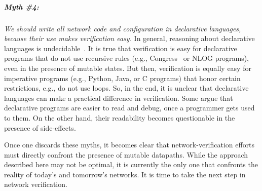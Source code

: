 \subparagraph*{Myth \#4:} \emph{We should write all network code and configuration in declarative languages, because their use makes verification easy.} In general, reasoning about declarative languages is undecidable~\cite{Halevy}. It is true that verification is easy for declarative programs that do not use recursive rules (e.g., Congress~\cite{congress} or NLOG programs), even in the presence of mutable states. But then, verification is equally easy for imperative programs (e.g., Python, Java, or C programs) that honor certain restrictions, e.g., do not use loops. So, in the end, it is unclear that declarative languages can make a practical difference in verification. Some argue that declarative programs are easier to read and debug, once a programmer gets used to them. On the other hand, their readability becomes questionable in the presence of side-effects.


Once one discards these myths, it becomes clear that network-verification efforts must directly confront the presence of mutable datapaths. While the approach described here may not be optimal, it is currently the only one that confronts the reality of today's and tomorrow's networks. It is time to take the next step in network verification.


